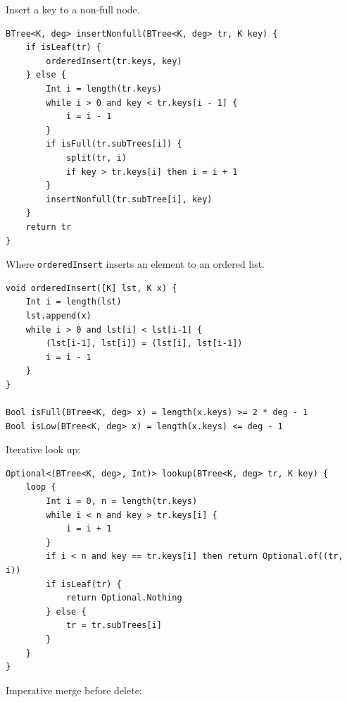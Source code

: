 \documentclass[b5paper]{article}
\begin{document}
Insert a key to a non-full node.

\begin{lstlisting}[language = Bourbaki]
BTree<K, deg> insertNonfull(BTree<K, deg> tr, K key) {
    if isLeaf(tr) {
        orderedInsert(tr.keys, key)
    } else {
        Int i = length(tr.keys)
        while i > 0 and key < tr.keys[i - 1] {
            i = i - 1
        }
        if isFull(tr.subTrees[i]) {
            split(tr, i)
            if key > tr.keys[i] then i = i + 1
        }
        insertNonfull(tr.subTree[i], key)
    }
    return tr
}
\end{lstlisting}

Where \texttt{orderedInsert} inserts an element to an ordered list.

\begin{lstlisting}[language = Bourbaki]
void orderedInsert([K] lst, K x) {
    Int i = length(lst)
    lst.append(x)
    while i > 0 and lst[i] < lst[i-1] {
        (lst[i-1], lst[i]) = (lst[i], lst[i-1])
        i = i - 1
    }
}

Bool isFull(BTree<K, deg> x) = length(x.keys) >= 2 * deg - 1
Bool isLow(BTree<K, deg> x) = length(x.keys) <= deg - 1
\end{lstlisting}

Iterative look up:

\begin{lstlisting}[language = Bourbaki]
Optional<(BTree<K, deg>, Int)> lookup(BTree<K, deg> tr, K key) {
    loop {
        Int i = 0, n = length(tr.keys)
        while i < n and key > tr.keys[i] {
            i = i + 1
        }
        if i < n and key == tr.keys[i] then return Optional.of((tr, i))
        if isLeaf(tr) {
            return Optional.Nothing
        } else {
            tr = tr.subTrees[i]
        }
    }
}
\end{lstlisting}

Imperative merge before delete:
\end{document}
